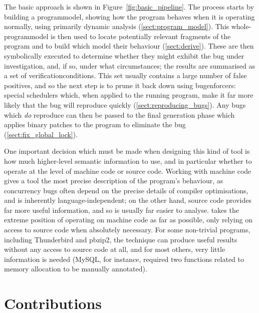 The basic approach is shown in Figure~\ref{fig:basic_pipeline}.  The
process starts by building a \gls{programmodel}, showing how the
program behaves when it is operating normally, using primarily dynamic
analysis (\autoref{sect:program_model}).  This
whole-\gls{programmodel} is then used to locate potentially relevant
fragments of the program and to build {\StateMachines} which model
their behaviour (\autoref{sect:derive}).  These {\StateMachines} are
then symbolically executed to determine
whether they might exhibit the bug under investigation, and, if so,
under what circumstances; the results are summarised as a set
of \glspl{verificationcondition}.  This set usually contains a large
number of false positives, and so the next step is to prune it back
down using \glspl{bugenforcer}: special schedulers which, when applied
to the running program, make it far more likely that the bug will
reproduce quickly (\autoref{sect:reproducing_bugs}).  Any bugs which
\emph{do} reproduce can then be passed to the final {\genfix} generation
phase which applies binary patches to the program to eliminate the bug
(\autoref{sect:fix_global_lock}).

One important decision which must be made when designing this kind of
tool is how much higher-level semantic information to use, and in
particular whether to operate at the level of machine code or source
code.  Working with machine code gives a tool the most precise
description of the program's behaviour, as concurrency bugs often
depend on the precise details of compiler optimisations, and is
inherently language-independent; on the other hand, source code
provides far more useful information, and so is usually far easier to
analyse.  {\Technique} takes the extreme position of operating on
machine code as far as possible, only relying on access to source code
when absolutely necessary.  For some non-trivial programs, including
Thunderbird and pbzip2, the technique can produce useful results
without any access to source code at all, and for most others, very
little information is needed (MySQL, for instance, required two
functions related to memory allocation to be manually annotated).

\section{Contributions}

